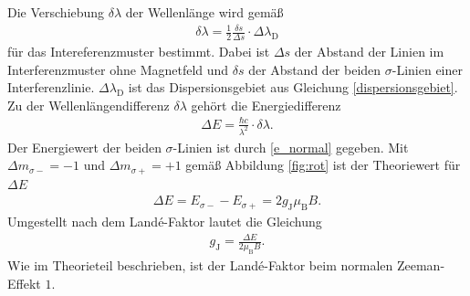 Die Verschiebung $\delta \lambda$ der Wellenlänge wird gemäß
\begin{align}
	\delta \lambda = \frac{1}{2} \frac{\delta s}{\Delta s} \cdot \Delta \lambda_\text{D}
\end{align}
für das Intereferenzmuster bestimmt.
Dabei ist $\Delta s$ der Abstand der Linien im Interferenzmuster ohne Magnetfeld und $\delta s$ der Abstand der beiden $\sigma$-Linien einer Interferenzlinie.
$\Delta \lambda_\text{D}$ ist das Dispersionsgebiet aus Gleichung \eqref{dispersionsgebiet}.
Zu der Wellenlängendifferenz $\delta \lambda$ gehört die Energiedifferenz
\begin{align}
	\Delta E = \frac{\hbar c}{\lambda^2}\cdot \delta \lambda.
\end{align}
Der Energiewert der beiden $\sigma$-Linien ist durch \eqref{e_normal} gegeben.
Mit $\Delta m_{\sigma-} = -1$ und $\Delta m_{\sigma+} = +1$ gemäß Abbildung \ref{fig:rot} ist der Theoriewert für $\Delta E$
\begin{align}
	\Delta E = E_{\sigma-} - E_{\sigma+} = 2 g_\text{J} \mu_\text{B} B.
\end{align}
Umgestellt nach dem Landé-Faktor lautet die Gleichung
\begin{align}
	g_\text{J} = \frac{\Delta E}{2 \mu_\text{B} B}.
\end{align}
Wie im Theorieteil beschrieben, ist der Landé-Faktor beim normalen Zeeman-Effekt $1$.